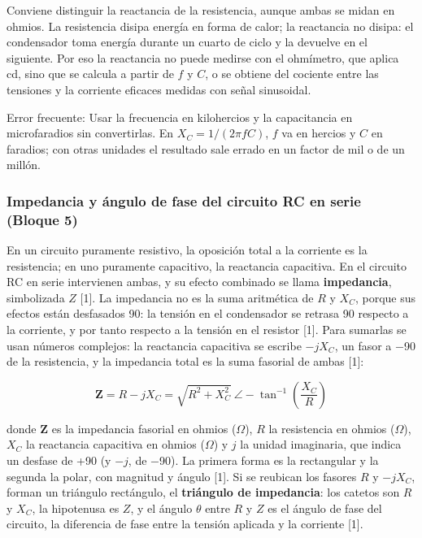\documentclass[11pt,letterpaper]{article}
\begin{document}
Conviene distinguir la reactancia de la resistencia, aunque ambas se midan en ohmios. La resistencia disipa energía en forma de calor; la reactancia no disipa: el condensador toma energía durante un cuarto de ciclo y la devuelve en el siguiente. Por eso la reactancia no puede medirse con el ohmímetro, que aplica cd, sino que se calcula a partir de $f$ y $C$, o se obtiene del cociente entre las tensiones y la corriente eficaces medidas con señal sinusoidal.

\begin{nota}{Error frecuente:}
Usar la frecuencia en kilohercios y la capacitancia en microfaradios sin convertirlas. En $X_C = 1/(2\pi f C)$, $f$ va en hercios y $C$ en faradios; con otras unidades el resultado sale errado en un factor de mil o de un millón.
\end{nota}

\subsubsection{Impedancia y ángulo de fase del circuito RC en serie (Bloque 5)}

En un circuito puramente resistivo, la oposición total a la corriente es la resistencia; en uno puramente capacitivo, la reactancia capacitiva. En el circuito RC en serie intervienen ambas, y su efecto combinado se llama \textbf{impedancia}, simbolizada $Z$ [1]. La impedancia no es la suma aritmética de $R$ y $X_C$, porque sus efectos están desfasados 90\textdegree{}: la tensión en el condensador se retrasa 90\textdegree{} respecto a la corriente, y por tanto respecto a la tensión en el resistor [1]. Para sumarlas se usan números complejos: la reactancia capacitiva se escribe $-jX_C$, un fasor a \ensuremath{-}90\textdegree{} de la resistencia, y la impedancia total es la suma fasorial de ambas [1]:

\begin{equation}
  \mathbf{Z} = R - jX_C = \sqrt{R^{2} + X_C^{2}}\ \angle -\tan^{-1}\!\left(\frac{X_C}{R}\right)
\end{equation}

donde $\mathbf{Z}$ es la impedancia fasorial en ohmios (\ensuremath{\Omega}), $R$ la resistencia en ohmios (\ensuremath{\Omega}), $X_C$ la reactancia capacitiva en ohmios (\ensuremath{\Omega}) y $j$ la unidad imaginaria, que indica un desfase de +90\textdegree{} (y $-j$, de \ensuremath{-}90\textdegree{}). La primera forma es la rectangular y la segunda la polar, con magnitud y ángulo [1]. Si se reubican los fasores $R$ y $-jX_C$, forman un triángulo rectángulo, el \textbf{triángulo de impedancia}: los catetos son $R$ y $X_C$, la hipotenusa es $Z$, y el ángulo $\theta$ entre $R$ y $Z$ es el ángulo de fase del circuito, la diferencia de fase entre la tensión aplicada y la corriente [1].
\end{document}
